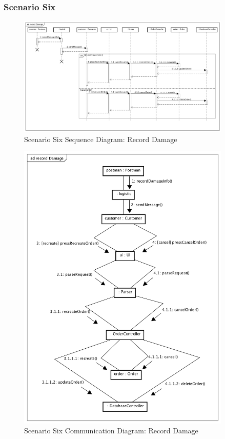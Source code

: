 \documentclass[12pt]{scrreprt}
\begin{document}
\subsubsection{Scenario Six}
\begin{figure}[H]
  \centering\includegraphics[width=4in]{DocumentRes/6SequenceDiagram_recordDamage.png}
  \caption{Scenario Six Sequence Diagram: Record Damage}
\end{figure}
\begin{figure}[H]
  \centering\includegraphics[width=4in]{DocumentRes/6CommunicationDiagram_recordDamage.png}
  \caption{Scenario Six Communication Diagram: Record Damage}
\end{figure}
\end{document}

